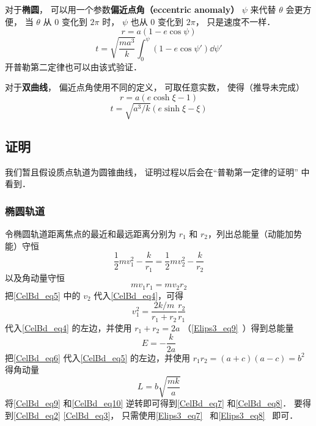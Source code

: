 对于\textbf{椭圆}， 可以用一个参数\textbf{偏近点角（eccentric anomaly）} $\psi$ 来代替 $\theta$ 会更方便， 当 $\theta$ 从 $0$ 变化到 $2\pi$ 时， $\psi$ 也从 $0$ 变化到 $2\pi$， 只是速度不一样．
\begin{equation}
r = a(1-e\cos\psi)
\end{equation}
\begin{equation}
t = \sqrt{\frac{ma^3}{k}} \int_0^\psi (1 - e\cos\psi')\dd{\psi'}
\end{equation}
开普勒第二定律也可以由该式验证．

对于\textbf{双曲线}， 偏近点角使用不同的定义， 可取任意实数， 使得（推导未完成）
\begin{equation}
r = a(e\cosh\xi - 1)
\end{equation}
\begin{equation}
t = \sqrt{a^3/k} (e\sinh\xi - \xi)
\end{equation}

\subsection{证明}
我们暂且假设质点轨道为圆锥曲线， 证明过程以后会在“普勒第一定律的证明” 中看到．

\subsubsection{椭圆轨道}
令椭圆轨道距离焦点的最近和最远距离分别为 $r_1$ 和 $r_2$，列出总能量（动能加势能）守恒
\begin{equation}\label{CelBd_eq4}
\frac12 m v_1^2 - \frac{k}{r_1} = \frac12 mv_2^2 - \frac{k}{r_2}
\end{equation}
以及角动量守恒
\begin{equation}\label{CelBd_eq5}
mv_1 r_1 = mv_2 r_2
\end{equation}
把\autoref{CelBd_eq5} 中的 $v_2$ 代入\autoref{CelBd_eq4}，可得
\begin{equation}\label{CelBd_eq6}
v_1^2 = \frac{2k/m}{r_1 + r_2} \frac{r_2}{r_1}
\end{equation}
代入\autoref{CelBd_eq4} 的左边，并使用 $r_1+r_2=2a$ （\autoref{Elips3_eq9}~）得到总能量
\begin{equation}\label{CelBd_eq9}
E = -\frac{k}{2a}
\end{equation}
把\autoref{CelBd_eq6} 代入\autoref{CelBd_eq5} 的左边，并使用 $r_1 r_2 = (a+c)(a-c) =b^2$ %
得角动量
\begin{equation}\label{CelBd_eq10}
L = b\sqrt{\frac{mk}{a}}
\end{equation}
将\autoref{CelBd_eq9} 和\autoref{CelBd_eq10} 逆转即可得到\autoref{CelBd_eq7} 和\autoref{CelBd_eq8}． 要得到\autoref{CelBd_eq2} \autoref{CelBd_eq3}， 只需使用\autoref{Elips3_eq7}~ 和\autoref{Elips3_eq8}~ 即可．

